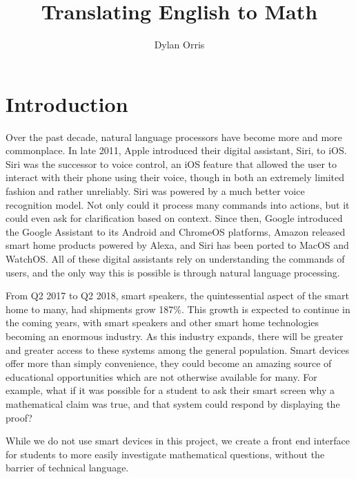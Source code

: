 \documentclass[12pt]{article}
\begin{document}
\title{Translating English to Math}
\author{Dylan Orris}
\maketitle
\tableofcontents
\pagebreak
\section{Introduction}
Over the past decade, natural language processors have become more and more commonplace. In late 2011, Apple introduced their digital assistant, Siri, to iOS. Siri was the successor to voice control, an iOS feature that allowed the user to interact with their phone using their voice, though in both an extremely limited fashion and rather unreliably. Siri was powered by a much better voice recognition model. Not only could it process many commands into actions, but it could even ask for clarification based on context. Since then, Google introduced the Google Assistant to its Android and ChromeOS platforms, Amazon released smart home products powered by Alexa, and Siri has been ported to MacOS and WatchOS. All of these digital assistants rely on understanding the commands of users, and the only way this is possible is through natural language processing. 

From Q2 2017 to Q2 2018, smart speakers, the quintessential aspect of the smart home to many, had shipments grow 187\%. \cite{canalys} %
This growth is expected to continue in the coming years, with smart speakers and other smart home technologies becoming an enormous industry. As this industry expands, there will be greater and greater access to these systems among the general population. Smart devices offer more than simply convenience, they could become an amazing source of educational opportunities which are not otherwise available for many. For example, what if it was possible for a student to ask their smart screen why a mathematical claim was true, and that system could respond by displaying the proof? 

While we do not use smart devices in this project, we create a front end interface for students to more easily investigate mathematical questions, without the barrier of technical language.
\end{document}
